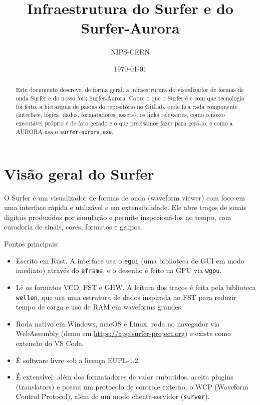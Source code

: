 \documentclass[11pt,a4paper]{article}
\title{Infraestrutura do Surfer e do Surfer-Aurora}
\author{NIPS-CERN}
\date{\today}
\begin{document}
\maketitle

\begin{abstract}
\noindent
Este documento descreve, de forma geral, a infraestrutura do visualizador de
formas de onda Surfer e do nosso fork Surfer-Aurora. Cobre o que o Surfer é e
com que tecnologia foi feito, a hierarquia de pastas do repositório no GitLab,
onde fica cada componente (interface, lógica, dados, formatadores, assets), os
links relevantes, como o nosso executável próprio é de fato gerado e o que
precisamos fazer para gerá-lo, e como a AURORA usa o \texttt{surfer-aurora.exe}.
\end{abstract}

\raggedright

\section{Visão geral do Surfer}

O Surfer é um visualizador de formas de onda (waveform viewer) com foco em uma
interface rápida e utilizável e em extensibilidade. Ele abre traços de sinais
digitais produzidos por simulação e permite inspecioná-los no tempo, com
curadoria de sinais, cores, formatos e grupos.

Pontos principais:

\begin{itemize}
  \item Escrito em Rust. A interface usa o \texttt{egui} (uma biblioteca de GUI
        em modo imediato) através do \texttt{eframe}, e o desenho é feito na GPU
        via \texttt{wgpu}.
  \item Lê os formatos VCD, FST e GHW. A leitura dos traços é feita pela
        biblioteca \texttt{wellen}, que usa uma estrutura de dados inspirada no
        FST para reduzir tempo de carga e uso de RAM em waveforms grandes.
  \item Roda nativo em Windows, macOS e Linux, roda no navegador via WebAssembly
        (demo em \url{https://app.surfer-project.org}) e existe como extensão do
        VS Code.
  \item É software livre sob a licença EUPL-1.2.
  \item É extensível: além dos formatadores de valor embutidos, aceita plugins
        (translators) e possui um protocolo de controle externo, o WCP (Waveform
        Control Protocol), além de um modo cliente-servidor (\texttt{surver}).
\end{itemize}
\end{document}
